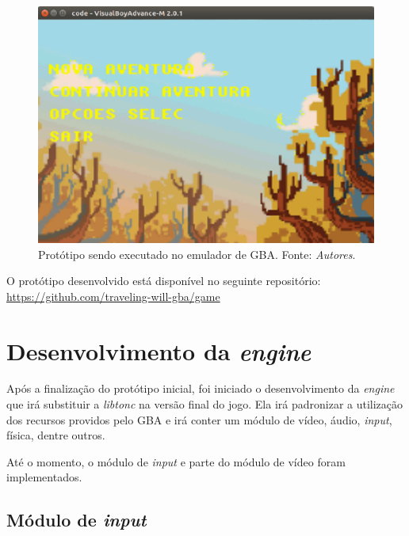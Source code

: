 \begin{figure}[H]
 \centering \includegraphics[keepaspectratio=true,scale=0.6]{figuras/tw-gba-1.eps}
   \caption[Protótipo sendo executado no emulador de GBA]
    {Protótipo sendo executado no emulador de GBA. Fonte: \textit{Autores}.}
   \label{tw-gba-1}
\end{figure}

O protótipo desenvolvido está disponível no seguinte repositório: \url{https://github.com/traveling-will-gba/game}

\section{Desenvolvimento da \textit{engine}}

Após a finalização do protótipo inicial, foi iniciado o desenvolvimento da \textit{engine} que irá substituir a \textit{libtonc} na versão final do jogo. Ela irá padronizar a utilização dos recursos providos pelo GBA e irá conter um módulo de vídeo, áudio, \textit{input}, física, dentre outros.

Até o momento, o módulo de \textit{input} e parte do módulo de vídeo foram implementados.

\subsection{Módulo de \textit{input}}

